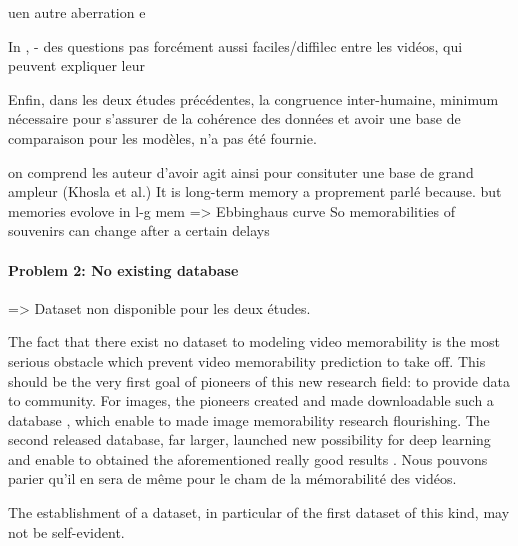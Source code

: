 \documentclass[sigconf]{acmart}
\begin{document}
uen autre aberration e





In \cite{shekhar_2017_show}, 
- des questions pas forcément aussi faciles/diffilec entre les vidéos, qui peuvent expliquer leur 

Enfin, dans les deux études précédentes, la congruence inter-humaine, minimum nécessaire pour s'assurer de la cohérence des données et avoir une base de comparaison pour les modèles, n'a pas été fournie.


on comprend les auteur d'avoir agit ainsi pour consituter une base de grand ampleur (Khosla et al.)
It is long-term memory a proprement parlé because.
but memories evolove in l-g mem
=> Ebbinghaus curve
So memorabilities of souvenirs can change after a certain delays


\paragraph{Problem 2: No existing database}
=> Dataset non disponible pour les deux études.

The fact that there exist no dataset to modeling video memorability is the most serious obstacle which prevent video memorability prediction to take off.
This should be the very first goal of pioneers of this new research field: to provide data to community.
For images, the pioneers created and made downloadable such a database \cite{isola_2011_makes}, which enable to made image memorability research flourishing.
The second released database, far larger, launched new possibility for deep learning and enable to obtained the aforementioned really good results \cite{khosla_2015_understanding}.
Nous pouvons parier qu'il en sera de même pour le cham de la mémorabilité des vidéos.

The establishment of a dataset, in particular of the first dataset of this kind, may not be self-evident.
\end{document}
